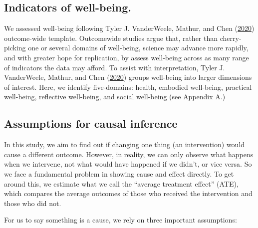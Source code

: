 \documentclass[
  singlecolumn]{report}
\begin{document}
\hypertarget{indicators-of-well-being.}{%
\subsection{Indicators of well-being.}\label{indicators-of-well-being.}}

We assessed well-being following Tyler J. VanderWeele, Mathur, and Chen
(\protect\hyperlink{ref-vanderweele2020}{2020}) outcome-wide template.
Outcomewide studies argue that, rather than cherry-picking one or
several domains of well-being, science may advance more rapidly, and
with greater hope for replication, by assess well-being across as many
range of indicators the data may afford. To assist with interpretation,
Tyler J. VanderWeele, Mathur, and Chen
(\protect\hyperlink{ref-vanderweele2020}{2020}) groups well-being into
larger dimensions of interest. Here, we identify five-domains: health,
embodied well-being, practical well-being, reflective well-being, and
social well-being (see Appendix A.)

\hypertarget{assumptions-for-causal-inference}{%
\subsection{Assumptions for causal
inference}\label{assumptions-for-causal-inference}}

In this study, we aim to find out if changing one thing (an
intervention) would cause a different outcome. However, in reality, we
can only observe what happens when we intervene, not what would have
happened if we didn't, or vice versa. So we face a fundamental problem
in showing cause and effect directly. To get around this, we estimate
what we call the ``average treatment effect'' (ATE), which compares the
average outcomes of those who received the intervention and those who
did not.

For us to say something is a cause, we rely on three important
assumptions:
\end{document}
